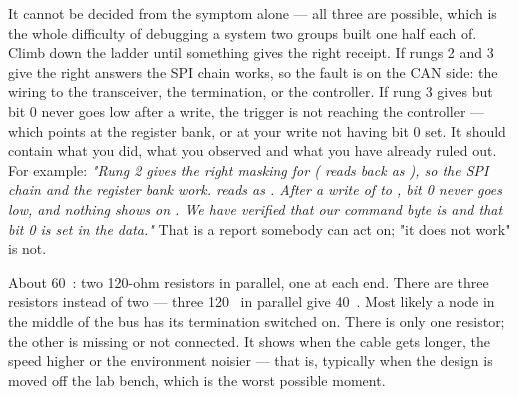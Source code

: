  It cannot be decided from the symptom alone --- all three are possible, which is the whole
difficulty of debugging a system two groups built one half each of.
 Climb down the ladder until something gives the right receipt. If rungs 2 and 3 give the
right answers the SPI chain works, so the fault is on the CAN side: the wiring to the transceiver,
the termination, or the controller. If rung 3 gives  but  bit 0
never goes low after a  write, the trigger is not reaching the controller --- which
points at the register bank, or at your write not having bit 0 set.
 It should contain what you did, what you observed and what you have already ruled out. For
example: \emph{"Rung 2 gives the right masking for  ( reads back as
), so the SPI chain and the register bank work.  reads as
. After a write of  to , bit 0 never goes low, and
nothing shows on . We have verified that our command byte is  and that bit
0 is set in the data."} That is a report somebody can act on; "it does not work" is not.

 About 60~\textohm: two 120-ohm resistors in parallel, one at each end.
 There are three resistors instead of two --- three 120~\textohm{} in parallel give
40~\textohm. Most likely a node in the middle of the bus has its termination switched on.
 There is only one resistor; the other is missing or not connected. It shows when the cable
gets longer, the speed higher or the environment noisier --- that is, typically when the design is
moved off the lab bench, which is the worst possible moment.
